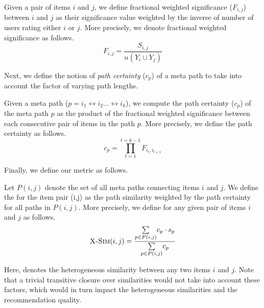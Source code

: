 \begin{definition}
Given a pair of items $i$ and $j$, we define fractional weighted significance ($F_{i,j}$) between $i$ and $j$ as their significance value weighted by the inverse of number of users rating either $i$ or $j$. More precisely, we denote fractional weighted significance as follows. $$
F_{i,j}=\frac{S_{i,j}}{n(Y_i \cup Y_j)}
$$
\end{definition}


Next, we define the notion of \emph{path certainty} ($c_p$) of a meta path to take into account the factor of varying path lengths.
\begin{definition}
Given a meta path ($p = i_1 \leftrightarrow i_2 \ldots \leftrightarrow i_k$), we compute the path certainty ($c_p$) of the meta path $p$ as the product of the fractional weighted significance between each consecutive pair of items in the path $p$. More precisely, we define the path certainty as follows.
$$
c_p= \prod_{t=1}^{t=k-1} F_{i_{t}, i_{t+1}}
$$
\end{definition}

Finally, we define our \graphsim metric as follows.

\begin{definition}[X-Sim]
Let $P (i, j)$ denote the set of all meta paths connecting items $i$ and $j$. We define the \graphsim for the item pair (i,j) as the path similarity weighted by the path certainty for all paths in $P(i,j)$. More precisely, we define \graphsim for any given pair of items $i$ and $j$ as follows.
$$
\textsc{X-Sim} (i, j) = \frac{\underset{p \in P (i, j)}{\sum} c_p \cdot s_p}{\underset{p
   \in P (i, j)}{\sum} c_p} 
$$
\end{definition}


Here,  denotes the heterogeneous similarity between any two items $i$ and $j$. Note that a trivial transitive closure over similarities would not take into account these factors, which would in turn impact the heterogeneous similarities and the recommendation quality.
